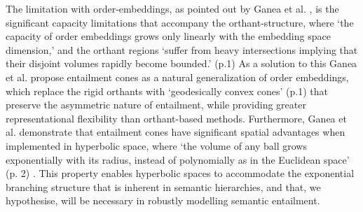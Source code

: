 \documentclass[12pt,twoside]{report}
\begin{document}
The limitation with order-embeddings, as pointed out by Ganea et al. \cite{ganea2018hyperbolicentailmentconeslearning}, is the significant capacity limitations that accompany the orthant-structure, where `the capacity of order embeddings grows only linearly with the embedding space dimension,' and the orthant regions `suffer from heavy intersections implying that their disjoint volumes rapidly become bounded.' (p.1) As a solution to this Ganea et al. propose entailment cones as a natural generalization of order embeddings, which replace the rigid orthants with `geodesically convex cones' (p.1) that preserve the asymmetric nature of entailment, while providing greater representational flexibility than orthant-based methods. \cite{ganea2018hyperbolicentailmentconeslearning} Furthermore, Ganea et al. demonstrate that entailment cones have significant spatial advantages when implemented in hyperbolic space, where `the volume of any ball grows exponentially with its radius, instead of polynomially as in the Euclidean space' (p. 2) \cite{ganea2018hyperbolicentailmentconeslearning}. This property enables hyperbolic spaces to accommodate the exponential branching structure that is inherent in semantic hierarchies, and that, we hypothesise, will be necessary in robustly modelling semantic entailment. 


\end{document}
